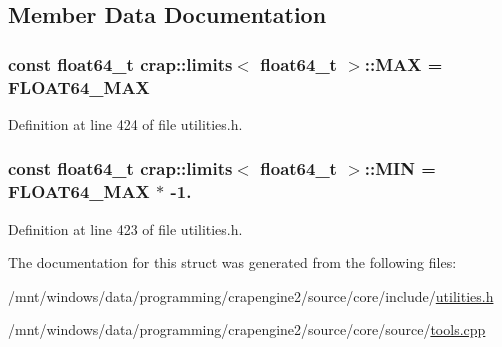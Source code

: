 \subsection{Member Data Documentation}
\hypertarget{structcrap_1_1limits_3_01float64__t_01_4_ac27ede6a3bbe14baeb6a1c00e51d9455}{
\subsubsection[{M\+A\+X}]{\setlength{\rightskip}{0pt plus 5cm}const {\bf float64\+\_\+t} {\bf crap\+::limits}$<$ {\bf float64\+\_\+t} $>$\+::M\+A\+X = {\bf F\+L\+O\+A\+T64\+\_\+\+M\+A\+X}\hspace{0.3cm}{\ttfamily [static]}}}\label{structcrap_1_1limits_3_01float64__t_01_4_ac27ede6a3bbe14baeb6a1c00e51d9455}


Definition at line 424 of file utilities.\+h.

\hypertarget{structcrap_1_1limits_3_01float64__t_01_4_a5d1630d9dd3b33fbbb2ef0d1fe181fa2}{
\subsubsection[{M\+I\+N}]{\setlength{\rightskip}{0pt plus 5cm}const {\bf float64\+\_\+t} {\bf crap\+::limits}$<$ {\bf float64\+\_\+t} $>$\+::M\+I\+N = {\bf F\+L\+O\+A\+T64\+\_\+\+M\+A\+X} $\ast$ -\/1.\hspace{0.3cm}{\ttfamily [static]}}}\label{structcrap_1_1limits_3_01float64__t_01_4_a5d1630d9dd3b33fbbb2ef0d1fe181fa2}


Definition at line 423 of file utilities.\+h.



The documentation for this struct was generated from the following files\+:\begin{DoxyCompactItemize}
\item 
/mnt/windows/data/programming/crapengine2/source/core/include/\hyperlink{utilities_8h}{utilities.\+h}\item 
/mnt/windows/data/programming/crapengine2/source/core/source/\hyperlink{tools_8cpp}{tools.\+cpp}\end{DoxyCompactItemize}
